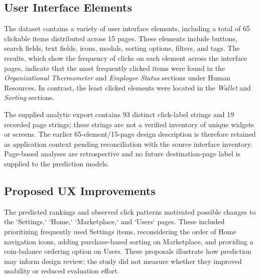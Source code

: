 \documentclass[sn-mathphys-num, Numbered]{sn-jnl}%
\theoremstyle{thmstyleone}%
\theoremstyle{thmstyletwo}%
\theoremstyle{thmstylethree}%
\begin{document}
%

\fi
\subsection{User Interface Elements}
The dataset contains a variety of user interface elements, including a total of 65 clickable items distributed across 15 pages. These elements include buttons, search fields, text fields, icons, modals, sorting options, filters, and tags. The results, which show the frequency of clicks on each element across the interface pages, indicate that the most frequently clicked items were found in the \textit{Organizational Thermometer} and \textit{Employee Status} sections under Human Resources. In contrast, the least clicked elements were located in the \textit{Wallet} and \textit{Sorting} sections.

The supplied analytic export contains 93 distinct click-label strings and 19 recorded page strings; these strings are not a verified inventory of unique widgets or screens. The earlier 65-element/15-page design description is therefore retained as application context pending reconciliation with the source interface inventory. Page-based analyses are retrospective and no future destination-page label is supplied to the prediction models.





\subsection{Proposed UX Improvements}
The predicted rankings and observed click patterns motivated possible changes to the `Settings,` `Home,` `Marketplace,` and `Users` pages. These included prioritizing frequently used Settings items, reconsidering the order of Home navigation icons, adding purchase-based sorting on Marketplace, and providing a coin-balance ordering option on Users. These proposals illustrate how prediction may inform design review; the study did not measure whether they improved usability or reduced evaluation effort.
\end{document}
